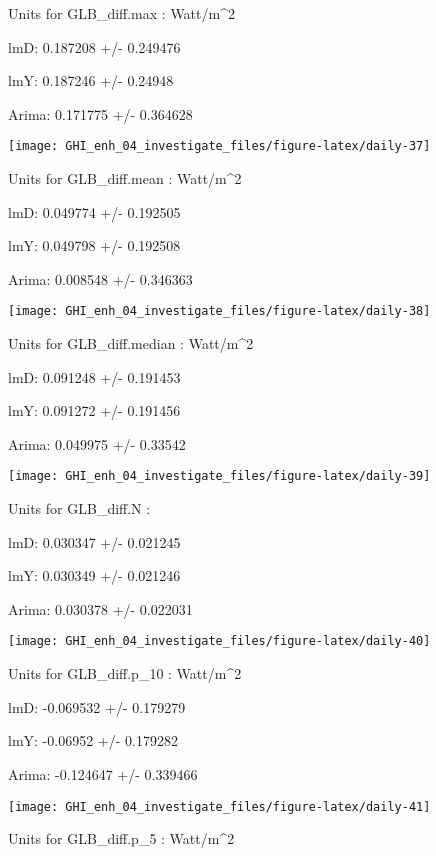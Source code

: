 \documentclass[
  10pt,
  a4paper,oneside]{article}
\begin{document}
Units for GLB\_diff.max : Watt/m\^{}2

lmD: 0.187208 +/- 0.249476

lmY: 0.187246 +/- 0.24948

Arima: 0.171775 +/- 0.364628

\begin{center}\texttt{[image: GHI\_enh\_04\_investigate\_files/figure-latex/daily-37]} \end{center}

Units for GLB\_diff.mean : Watt/m\^{}2

lmD: 0.049774 +/- 0.192505

lmY: 0.049798 +/- 0.192508

Arima: 0.008548 +/- 0.346363

\begin{center}\texttt{[image: GHI\_enh\_04\_investigate\_files/figure-latex/daily-38]} \end{center}

Units for GLB\_diff.median : Watt/m\^{}2

lmD: 0.091248 +/- 0.191453

lmY: 0.091272 +/- 0.191456

Arima: 0.049975 +/- 0.33542

\begin{center}\texttt{[image: GHI\_enh\_04\_investigate\_files/figure-latex/daily-39]} \end{center}

Units for GLB\_diff.N :

lmD: 0.030347 +/- 0.021245

lmY: 0.030349 +/- 0.021246

Arima: 0.030378 +/- 0.022031

\begin{center}\texttt{[image: GHI\_enh\_04\_investigate\_files/figure-latex/daily-40]} \end{center}

Units for GLB\_diff.p\_10 : Watt/m\^{}2

lmD: -0.069532 +/- 0.179279

lmY: -0.06952 +/- 0.179282

Arima: -0.124647 +/- 0.339466

\begin{center}\texttt{[image: GHI\_enh\_04\_investigate\_files/figure-latex/daily-41]} \end{center}

Units for GLB\_diff.p\_5 : Watt/m\^{}2
\end{document}
